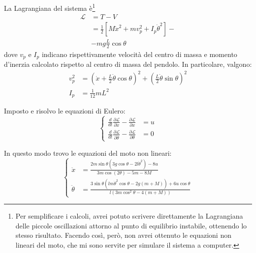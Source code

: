 La Lagrangiana del sistema è\footnote{Per semplificare i calcoli, avrei potuto scrivere direttamente la Lagrangiana delle
piccole oscillazioni attorno al punto di equilibrio instabile, ottenendo lo stesso risultato. Facendo così, però, non avrei
ottenuto le equazioni non lineari del moto, che mi sono servite per simulare il sistema a computer.}
\begin{equation}
  \begin{aligned}
    \mathcal L &= T - V\\
      &= \frac 1 2 \left[
        M \dot x^2 + mv_{p}^2 + I_{p} \dot \theta^2
      \right] -\\
      &- mg\frac L 2\cos{\theta}
    \end{aligned}
  \label{eq:lagrangiana}
\end{equation}
dove $v_p$ e $I_p$ indicano rispettivamente velocità del centro di massa e momento d'inerzia calcolato rispetto al
centro di massa del pendolo.
In particolare, valgono:
\begin{equation}
  \begin{aligned}
    v_p^2 &= \left(\dot x + \frac L 2 \dot \theta \cos{\theta}\right)^2 + \left(\frac L 2 \dot \theta \sin{\theta}\right)^2 \\
    I_p &= \frac 1 {12} m L^2
  \end{aligned}
  \label{eq:lagrangiana-2}
\end{equation}

Imposto e risolvo le equazioni di Eulero:
\begin{equation}
  \left\{
    \begin{aligned}
      \frac d {dt} \frac {\partial \mathcal L} {\partial \dot x } - \frac {\partial \mathcal L} {\partial  x}&= u \\
      \frac d {dt} \frac {\partial \mathcal L} {\partial \dot \theta } - \frac {\partial \mathcal L} {\partial \theta}&= 0
    \end{aligned}
  \right.
  \label{eq:eulero}
\end{equation}

In questo modo trovo le equazioni del moto non lineari:
\begin{equation}
  \left\{
  \begin{aligned}
    \ddot x &= \frac{2m\sin\theta\left(3g\cos\theta-2l\dot \theta^2\right)-8u}{3m\cos(2\theta)-5m-8M} \\
    \ddot \theta &= \frac{3\sin\theta \left(lm\dot \theta^2\cos\theta-2g(m+M)\right)+6u\cos\theta}{l\left(3m\cos^2\theta-4(m+M)\right)}
  \end{aligned}
  \right.
  \label{eq:moto}
\end{equation}

